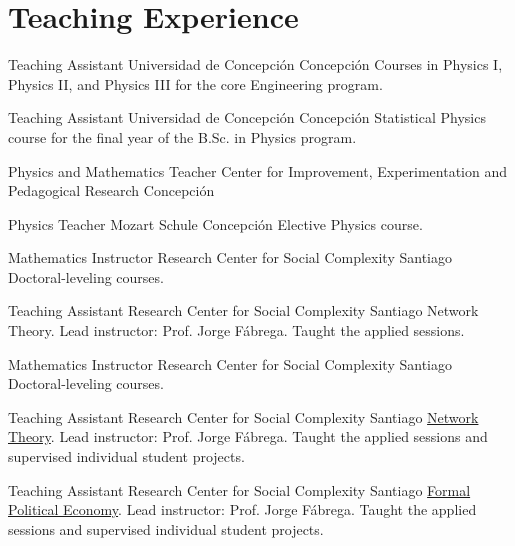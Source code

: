 \section{Teaching Experience}

        {Teaching Assistant}
        {Universidad de Concepción}
        {Concepción} 
        {Courses in Physics I, Physics II, and Physics III for the core Engineering program.}   %
        {}

        {Teaching Assistant}
        {Universidad de Concepción}
        {Concepción}
        {Statistical Physics course for the final year of the B.Sc. in Physics program.}  %
        {}


        {Physics and Mathematics Teacher}
        {Center for Improvement, Experimentation and Pedagogical Research}
        {Concepción}
        {}   %
        {}

        {Physics Teacher}
        {Mozart Schule}
        {Concepción}
        {Elective Physics course.}   %
        {}
        
        {Mathematics Instructor}
        {Research Center for Social Complexity}
        {Santiago}
        {\newline Doctoral-leveling courses.}
        {}

        {Teaching Assistant}
        {Research Center for Social Complexity}
        {Santiago}
        {\newline Network Theory. Lead instructor: Prof. Jorge Fábrega. Taught the applied sessions.}
        {}

        {Mathematics Instructor}
        {Research Center for Social Complexity}
        {Santiago}
        {\newline Doctoral-leveling courses.}
        {}

        {Teaching Assistant}
        {Research Center for Social Complexity}
        {Santiago}
        {\newline \href{https://github.com/aoliveram/Redes-Sociales-2025}{Network Theory}. Lead instructor: Prof. Jorge Fábrega. Taught the applied sessions and supervised individual student projects.}
        {}

        {Teaching Assistant}
        {Research Center for Social Complexity}
        {Santiago}
        {\newline \href{https://github.com/aoliveram/Economia-Politica-Formal-2025}{Formal Political Economy}. Lead instructor: Prof. Jorge Fábrega. Taught the applied sessions and supervised individual student projects.}
        {}

